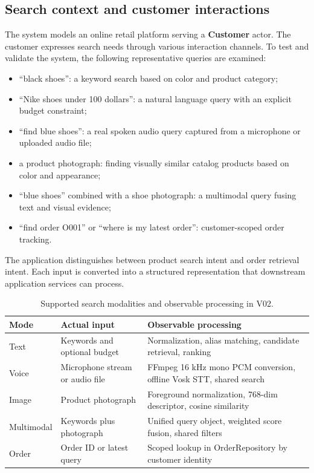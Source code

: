\documentclass[12pt,a4paper]{article}
\begin{document}
\subsection{Search context and customer interactions}
The system models an online retail platform serving a \textbf{Customer} actor. The customer expresses search needs through various interaction channels. To test and validate the system, the following representative queries are examined:
\begin{itemize}
\item ``black shoes'': a keyword search based on color and product category;
\item ``Nike shoes under 100 dollars'': a natural language query with an explicit budget constraint;
\item ``find blue shoes'': a real spoken audio query captured from a microphone or uploaded audio file;
\item a product photograph: finding visually similar catalog products based on color and appearance;
\item ``blue shoes'' combined with a shoe photograph: a multimodal query fusing text and visual evidence;
\item ``find order O001'' or ``where is my latest order'': customer-scoped order tracking.
\end{itemize}
The application distinguishes between product search intent and order retrieval intent. Each input is converted into a structured representation that downstream application services can process.

\begin{table}[htbp]\centering\small
\caption{Supported search modalities and observable processing in V02.}\label{tab:inputs}
\begin{tabularx}{\textwidth}{@{}lLL@{}}\toprule
\textbf{Mode} & \textbf{Actual input} & \textbf{Observable processing} \\\midrule
Text & Keywords and optional budget & Normalization, alias matching, candidate retrieval, ranking \\
Voice & Microphone stream or audio file & FFmpeg 16 kHz mono PCM conversion, offline Vosk STT, shared search \\
Image & Product photograph & Foreground normalization, 768-dim descriptor, cosine similarity \\
Multimodal & Keywords plus photograph & Unified query object, weighted score fusion, shared filters \\
Order & Order ID or latest query & Scoped lookup in OrderRepository by customer identity \\
\bottomrule\end{tabularx}\end{table}
\end{document}
